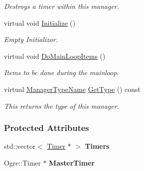 \begin{DoxyCompactItemize}
\begin{DoxyCompactList}\small\item\em Destroys a timer within this manager. \item\end{DoxyCompactList}\item 
virtual void \hyperlink{classphys_1_1TimerManager_ab6ee47352a406682178b4496544bcf6f}{Initialize} ()
\begin{DoxyCompactList}\small\item\em Empty Initializor. \item\end{DoxyCompactList}\item 
virtual void \hyperlink{classphys_1_1TimerManager_a98b7e74fe1e3eff7aee506477abe2a9c}{DoMainLoopItems} ()
\begin{DoxyCompactList}\small\item\em Items to be done during the mainloop. \item\end{DoxyCompactList}\item 
virtual \hyperlink{classphys_1_1ManagerBase_aaa6ccddf23892eaccb898529414f80a5}{ManagerTypeName} \hyperlink{classphys_1_1TimerManager_a716811f51cb9e97ed6e9db310f34e9dc}{GetType} () const 
\begin{DoxyCompactList}\small\item\em This returns the type of this manager. \item\end{DoxyCompactList}\end{DoxyCompactItemize}
\subsubsection*{Protected Attributes}
\begin{DoxyCompactItemize}
\item 
\hypertarget{classphys_1_1TimerManager_abaee576a7ee35350aac057c6970d0256}{
std::vector$<$ \hyperlink{classphys_1_1Timer}{Timer} $\ast$ $>$ {\bfseries Timers}}
\label{dc/d66/classphys_1_1TimerManager_abaee576a7ee35350aac057c6970d0256}

\item 
\hypertarget{classphys_1_1TimerManager_aa892d5ff53ecbe14f557baccdc16dc4f}{
Ogre::Timer $\ast$ {\bfseries MasterTimer}}
\label{dc/d66/classphys_1_1TimerManager_aa892d5ff53ecbe14f557baccdc16dc4f}

\end{DoxyCompactItemize}


